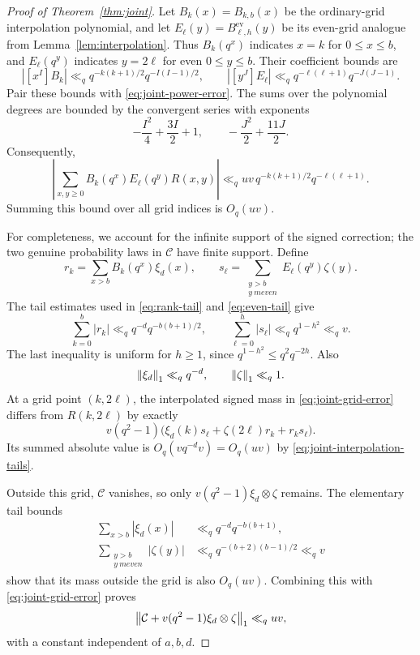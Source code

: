 \begin{proof}[Proof of Theorem~\ref{thm:joint}]
Let $B_k(x)=B_{k,b}(x)$ be the ordinary-grid interpolation polynomial,
and let $E_\ell(y)=B^{\mathrm{ev}}_{\ell,h}(y)$ be its even-grid analogue
from Lemma~\ref{lem:interpolation}. Thus $B_k(q^x)$ indicates $x=k$ for
$0\le x\le b$, and $E_\ell(q^y)$ indicates $y=2\ell$ for even
$0\le y\le b$. Their coefficient bounds are
\[
 |[x^I]B_k|\ll_q q^{-k(k+1)/2}q^{-I(I-1)/2},\qquad
 |[y^J]E_\ell|\ll_q q^{-\ell(\ell+1)}q^{-J(J-1)}.
\]
Pair these bounds with \eqref{eq:joint-power-error}. The sums over the
polynomial degrees are bounded by the convergent series with exponents
\[
 -\frac{I^2}{4}+\frac{3I}{2}+1,
 \qquad
 -\frac{J^2}{2}+\frac{11J}{2}.
\]
Consequently,
\begin{equation}\label{eq:joint-grid-error}
 \left|\sum_{x,y\ge0}B_k(q^x)E_\ell(q^y)R(x,y)\right|
 \ll_q uv\,q^{-k(k+1)/2}q^{-\ell(\ell+1)}.
\end{equation}
Summing this bound over all grid indices is $O_q(uv)$.

For completeness, we account for the infinite support of the signed
correction; the two genuine probability laws in $\mathcal C$ have finite
support. Define
\[
 r_k=\sum_{x>b}B_k(q^x)\xi_d(x),\qquad
 s_\ell=\sum_{\substack{y>b\\y\ {
m even}}}E_\ell(q^y)\zeta(y).
\]
The tail estimates used in \eqref{eq:rank-tail} and \eqref{eq:even-tail}
give
\begin{equation}\label{eq:joint-interpolation-tails}
 \sum_{k=0}^{b}|r_k|\ll_q q^{-d}q^{-b(b+1)/2},\qquad
 \sum_{\ell=0}^{h}|s_\ell|\ll_q q^{1-h^2}\ll_q v.
\end{equation}
The last inequality is uniform for $h\ge1$, since
$q^{1-h^2}\le q^2q^{-2h}$. Also
\[
 \left\|\xi_d\right\|_1\ll_q q^{-d},\qquad \left\|\zeta\right\|_1\ll_q1.
\]
At a grid point $(k,2\ell)$, the interpolated signed mass in
\eqref{eq:joint-grid-error} differs from $R(k,2\ell)$ by exactly
\[
 v(q^2-1)
 \bigl(\xi_d(k)s_\ell+\zeta(2\ell)r_k+r_ks_\ell\bigr).
\]
Its summed absolute value is $O_q(vq^{-d}v)=O_q(uv)$ by
\eqref{eq:joint-interpolation-tails}.

Outside this grid, $\mathcal C$ vanishes, so only
$v(q^2-1)\xi_d\otimes\zeta$ remains. The elementary tail bounds
\begin{align*}
 \sum_{x>b}|\xi_d(x)|&\ll_q q^{-d}q^{-b(b+1)},\\
 \sum_{\substack{y>b\\y\ {
m even}}}|\zeta(y)|
   &\ll_q q^{-(b+2)(b-1)/2}\ll_q v
\end{align*}
show that its mass outside the grid is also $O_q(uv)$.
Combining this with \eqref{eq:joint-grid-error} proves
\[
 \left\|\mathcal C+v(q^2-1)\xi_d\otimes\zeta\right\|_1\ll_q uv,
\]
with a constant independent of $a,b,d$.


\end{proof}
